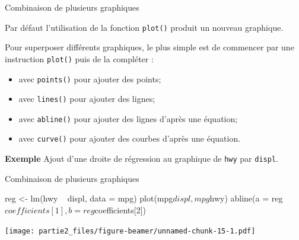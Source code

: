 \documentclass[12pt,ignorenonframetext,]{beamer}
\newenvironment{Shaded}{}{}
\newcommand{\KeywordTok}[1]{\textcolor[rgb]{0.00,0.00,1.00}{#1}}
\newcommand{\DataTypeTok}[1]{#1}
\newcommand{\DecValTok}[1]{#1}
\newcommand{\StringTok}[1]{\textcolor[rgb]{0.00,0.50,0.50}{#1}}
\newcommand{\OperatorTok}[1]{#1}
\newcommand{\NormalTok}[1]{#1}
\providecommand{\tightlist}{%
  \setlength{\itemsep}{0pt}\setlength{\parskip}{0pt}}
\renewenvironment{Shaded}{\begin{snugshade}}{\end{snugshade}}
\begin{document}
\begin{frame}[fragile]{Combinaison de plusieurs graphiques}

Par défaut l'utilisation de la fonction \texttt{plot()} produit un
nouveau graphique.

\pause Pour superposer différents graphiques, le plus simple est de
commencer par une instruction \texttt{plot()} puis de la compléter :

\begin{itemize}
\tightlist
\item
  avec \texttt{points()} pour ajouter des points;
\item
  avec \texttt{lines()} pour ajouter des lignes;
\item
  avec \texttt{abline()} pour ajouter des lignes d'après une équation;
\item
  avec \texttt{curve()} pour ajouter des courbes d'après une équation.
\end{itemize}

\pause 

\textbf{Exemple} Ajout d'une droite de régression au graphique de
\texttt{hwy} par \texttt{displ}.

\end{frame}

\begin{frame}[fragile]{Combinaison de plusieurs graphiques}

\footnotesize

\begin{Shaded}
\begin{Highlighting}[]
\NormalTok{reg <-}\StringTok{ }\KeywordTok{lm}\NormalTok{(hwy }\OperatorTok{~}\StringTok{ }\NormalTok{displ, }\DataTypeTok{data =}\NormalTok{ mpg)}
\KeywordTok{plot}\NormalTok{(mpg}\OperatorTok{$}\NormalTok{displ, mpg}\OperatorTok{$}\NormalTok{hwy)}
\KeywordTok{abline}\NormalTok{(}\DataTypeTok{a =}\NormalTok{ reg}\OperatorTok{$}\NormalTok{coefficients[}\DecValTok{1}\NormalTok{], }\DataTypeTok{b =}\NormalTok{ reg}\OperatorTok{$}\NormalTok{coefficients[}\DecValTok{2}\NormalTok{])}
\end{Highlighting}
\end{Shaded}

\texttt{[image: partie2\_files/figure-beamer/unnamed-chunk-15-1.pdf]}

\end{frame}
\end{document}
